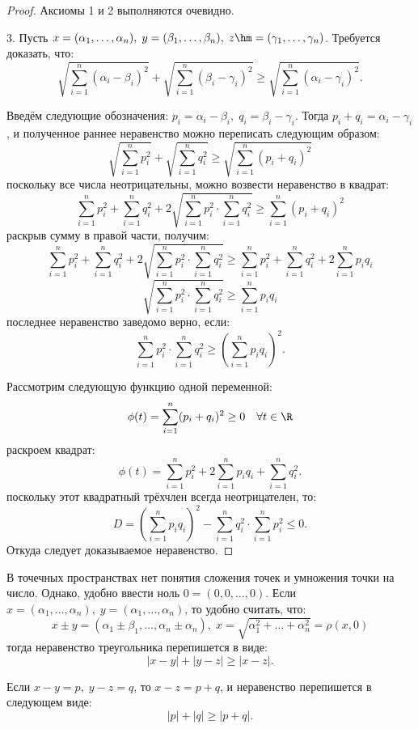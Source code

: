 \begin{proof}
Аксиомы 1 и 2 выполняются очевидно.

3. Пусть \(x = (\alpha_1, \dots, \alpha_n), \; y = (\beta_1, \dots, \beta_n), \; z \hm = (\gamma_1,
\dots, \gamma_n)\). Требуется доказать, что:
\[
    \sqrt{\sum_{i=1}^n (\alpha_i - \beta_i)^2} + \sqrt{\sum_{i=1}^n (\beta_i - \gamma_i)^2} \geq
        \sqrt{\sum_{i=1}^n (\alpha_i - \gamma_i)^2}.
\]

Введём следующие обозначения: \(p_i = \alpha_i - \beta_i, \; q_i = \beta_i - \gamma_i\). Тогда \(p_i
+ q_i = \alpha_i - \gamma_i\), и полученное раннее неравенство можно переписать следующим образом:
\[
    \sqrt{\sum_{i=1}^n p_i^2} + \sqrt{\sum_{i=1}^n q_i^2} \geq \sqrt{\sum_{i=1}^n (p_i + q_i)^2}
\]
поскольку все числа неотрицательны, можно возвести неравенство в квадрат:
\[
    \sum_{i=1}^n p_i^2 + \sum_{i=1}^n q_i^2 + 2\sqrt{\sum_{i=1}^n p_i^2 \cdot \sum_{i=1}^n q_i^2}
        \geq \sum_{i=1}^n (p_i + q_i)^2
\]
раскрыв сумму в правой части, получим:
\[
    \sum_{i=1}^n p_i^2 + \sum_{i=1}^n q_i^2 + 2\sqrt{\sum_{i=1}^n p_i^2 \cdot \sum_{i=1}^n q_i^2}
        \geq \sum_{i=1}^n p_i^2 + \sum_{i=1}^n q_i^2 + 2\sum_{i=1}^n p_i q_i
\]
\[
    \sqrt{\sum_{i=1}^n p_i^2 \cdot \sum_{i=1}^n q_i^2} \geq \sum_{i=1}^n p_i q_i
\]
последнее неравенство заведомо верно, если:
\[
    \sum_{i=1}^n p_i^2 \cdot \sum_{i=1}^n q_i^2 \geq \left(\sum_{i=1}^n p_i q_i\right)^2.
\]

Рассмотрим следующую функцию одной переменной:
\[
    \phi(t) = \sum_{i=1}^n (p_i + q_i)^2 \geq 0 \quad \forall t \in \R
\]
раскроем квадрат:
\[
    \phi(t) = \sum_{i=1}^n p_i^2 + 2\sum_{i=1}^n p_i q_i + \sum_{i=1}^n q_i^2.
\]
поскольку этот квадратный трёхчлен всегда неотрицателен, то:
\[
    D = \left(\sum_{i = 1}^n p_i q_i\right)^2 - \sum_{i=1}^n q_i^2 \cdot \sum_{i=1}^n p_i^2 \leq 0.
\]
Откуда следует доказываемое неравенство.
\end{proof}

\begin{note}
В точечных пространствах нет понятия сложения точек и умножения точки на число. Однако, удобно
ввести ноль \(0 = (0, 0, \dots, 0)\). Если \(x = (\alpha_1, \dots, \alpha_n), \; y = (\alpha_1,
\dots, \alpha_n)\), то удобно считать, что:
\[
    x \pm y = (\alpha_1 \pm \beta_1, \dots, \alpha_n \pm \alpha_n), \; x = \sqrt{\alpha_1^2 + \dots
        + \alpha_n^2} = \rho(x, 0)
\]
тогда неравенство треугольника перепишется в виде:
\[
    |x - y| + |y - z| \geq |x - z|.
\]

Если \(x - y = p, \; y - z = q\), то \(x - z = p + q\), и неравенство перепишется в следующем виде:
\[
    |p| + |q| \geq |p + q|.
\]
\end{note}

